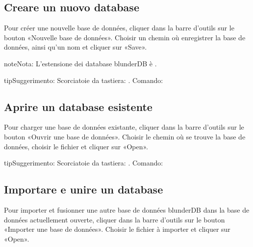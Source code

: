 \documentclass[letterpaper,10pt,italian]{sphinxmanual}
\begin{document}
\subsection{Creare un nuovo database}
\label{\detokenize{guide_utilisateur:creer-une-nouvelle-base-de-donnees}}
\sphinxAtStartPar
Pour créer une nouvelle base de données, cliquer dans la barre d’outils sur le
bouton «Nouvelle base de données». Choisir un chemin où enregistrer la base de
données, ainsi qu’un nom et cliquer sur «Save».

\begin{sphinxadmonition}{note}{Nota:}
\sphinxAtStartPar
L’estensione dei database blunderDB è .
\end{sphinxadmonition}

\begin{sphinxadmonition}{tip}{Suggerimento:}
\sphinxAtStartPar
Scorciatoie da tastiera: . Comando: 
\end{sphinxadmonition}


\subsection{Aprire un database esistente}
\label{\detokenize{guide_utilisateur:ouvrir-une-base-de-donnee-existante}}
\sphinxAtStartPar
Pour charger une base de données existante, cliquer dans la barre d’outils sur
le bouton «Ouvrir une base de données». Choisir le chemin où se trouve la base
de données, choisir le fichier  et cliquer sur «Open».

\begin{sphinxadmonition}{tip}{Suggerimento:}
\sphinxAtStartPar
Scorciatoie da tastiera: . Comando: 
\end{sphinxadmonition}


\subsection{Importare e unire un database}
\label{\detokenize{guide_utilisateur:importer-et-fusionner-une-base-de-donnees}}
\sphinxAtStartPar
Pour importer et fusionner une autre base de données blunderDB dans la base de
données actuellement ouverte, cliquer dans la barre d’outils sur le bouton
«Importer une base de données». Choisir le fichier  à importer et
cliquer sur «Open».
\end{document}
